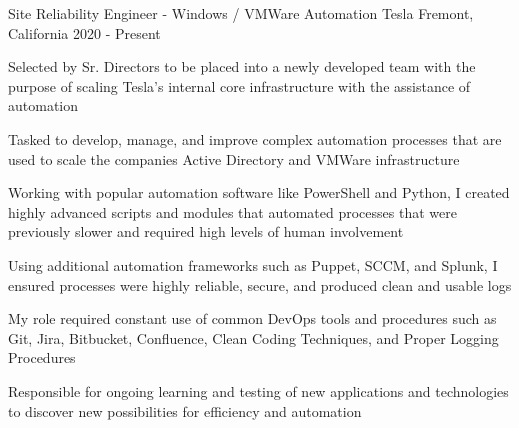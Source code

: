 

\begin{cventries}

  \cventry
    {Site Reliability Engineer - Windows / VMWare Automation} %
    {Tesla} %
    {Fremont, California} %
    {2020 - Present} %
    {
      \begin{cvitems} %
        \item {Selected by Sr. Directors to be placed into a newly developed team with the purpose of scaling Tesla's internal core infrastructure with the assistance of automation }
        \item{Tasked to develop, manage, and improve complex automation processes that are used to scale the companies Active Directory and VMWare infrastructure }
        \item {Working with popular automation software like PowerShell and Python, I created highly advanced scripts and modules that automated processes that were previously slower and required high levels of human involvement}
        \item{Using additional automation frameworks such as Puppet, SCCM, and Splunk, I ensured processes were highly reliable, secure, and produced clean and usable logs}
        \item{My role required constant use of common DevOps tools and procedures such as Git, Jira, Bitbucket, Confluence, Clean Coding Techniques, and Proper Logging Procedures}
        \item{Responsible for ongoing learning and testing of new applications and technologies to discover new possibilities for efficiency and automation   }
      \end{cvitems}
    }


\end{cventries}

